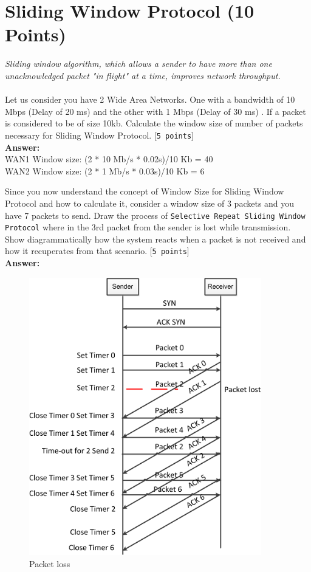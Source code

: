 \documentclass{WeSTassignment}
\begin{document}
\section{Sliding Window Protocol (10 Points)}
\emph{Sliding window algorithm, which allows a sender to have more than one unacknowledged packet "in flight" at a time, improves network throughput. }\\ \\
Let us consider you have 2 Wide Area Networks. One with a bandwidth of 10 Mbps (Delay of 20 ms) and the other with 1 Mbps (Delay of 30 ms) . If a packet is considered to be of size 10kb. Calculate the window size of number of packets necessary for Sliding Window Protocol. [\texttt{5 points}]\\
\textbf{Answer:} \\
WAN1 Window size: (2 * 10 Mb/s * 0.02s)/10 Kb = 40 \\
WAN2 Window size: (2 * 1 Mb/s * 0.03s)/10 Kb = 6 


Since you now understand the concept of Window Size for Sliding Window Protocol and how to calculate it, consider a window size of 3 packets and you have 7 packets to send. Draw the process of \texttt{Selective Repeat Sliding Window Protocol} where in the 3rd packet from the sender is lost while transmission. Show diagrammatically how the system reacts when a packet is not received and how it recuperates from that scenario. [\texttt{5 points}]\\ 
\textbf{Answer:} \\
\begin{figure}[ht]
	\centering
	\includegraphics[width=0.9\textwidth]{tango_assignment2_3_2.png}
	\caption{Packet loss}
	\label{fig:packet_loss}
\end{figure}
\end{document}
